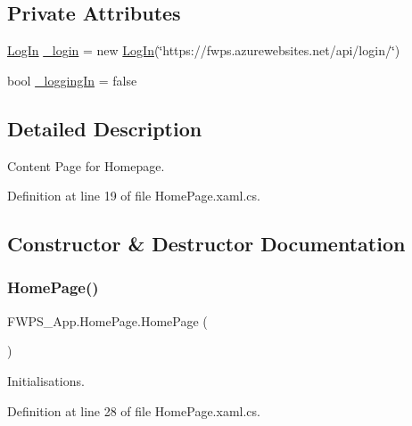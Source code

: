 \subsection*{Private Attributes}
\begin{DoxyCompactItemize}
\item 
\mbox{\hyperlink{class_f_w_p_s___app_1_1_log_in}{Log\+In}} \mbox{\hyperlink{class_f_w_p_s___app_1_1_home_page_a8ec7493e61225595cf90149c31da5ef5}{\+\_\+login}} = new \mbox{\hyperlink{class_f_w_p_s___app_1_1_log_in}{Log\+In}}(\char`\"{}https\+://fwps.\+azurewebsites.\+net/api/login/\char`\"{})
\item 
bool \mbox{\hyperlink{class_f_w_p_s___app_1_1_home_page_aa4738baf0c1037a3550fe73c0a700610}{\+\_\+logging\+In}} = false
\end{DoxyCompactItemize}


\subsection{Detailed Description}
Content Page for Homepage. 

Definition at line 19 of file Home\+Page.\+xaml.\+cs.



\subsection{Constructor \& Destructor Documentation}
\mbox{\label{class_f_w_p_s___app_1_1_home_page_ad71b37dbb11335bf9f6d131f60d09064}} 
\subsubsection{\texorpdfstring{Home\+Page()}{HomePage()}}
{\footnotesize\ttfamily F\+W\+P\+S\+\_\+\+App.\+Home\+Page.\+Home\+Page (\begin{DoxyParamCaption}{ }\end{DoxyParamCaption})}



Initialisations. 



Definition at line 28 of file Home\+Page.\+xaml.\+cs.



